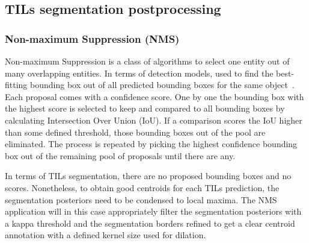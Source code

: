 \subsection{TILs segmentation postprocessing}
\subsubsection{Non-maximum Suppression (NMS)}
Non-maximum Suppression is a class of algorithms to select
one entity out of many overlapping entities. In terms of
detection models, used to find the best-fitting bounding box out of all predicted
bounding boxes for the same object~\cite{bodla2017soft}.
Each proposal comes with a confidence score. One by one the bounding box with
the highest score is selected to keep and compared to all bounding boxes by calculating Intersection Over Union (IoU).
If a comparison scores the IoU higher than some defined threshold,
those bounding boxes out of the pool are eliminated.
The process is repeated by picking the highest confidence bounding box out of the
remaining pool of proposals until there are any.

In terms of TILs segmentation, there are no proposed bounding boxes and no scores.
Nonetheless, to obtain good centroids for each TILs prediction, the segmentation posteriors
need to be condensed to local maxima. The NMS application will in this case appropriately
filter the segmentation posteriors with a kappa threshold and the segmentation borders
refined to get a clear centroid annotation with a defined kernel size used for dilation.

